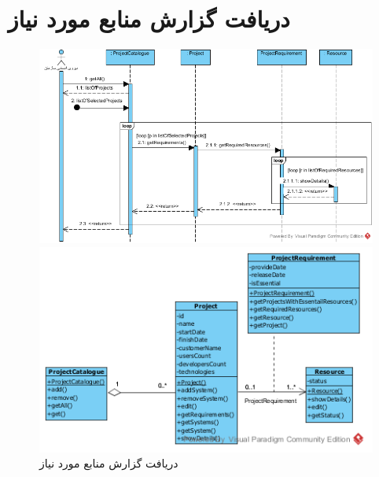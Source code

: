 \section{دریافت گزارش منابع مورد نیاز}
\begin{figure}[H]
	\centering
	\includegraphics[scale=0.8]{img/sequence-analysis/RequiredResourcesReport}
	
	
	\includegraphics[scale=0.8]{img/sequence-analysis/RequiredResourcesReportC}
	\caption{دریافت گزارش منابع مورد نیاز}
\end{figure}

